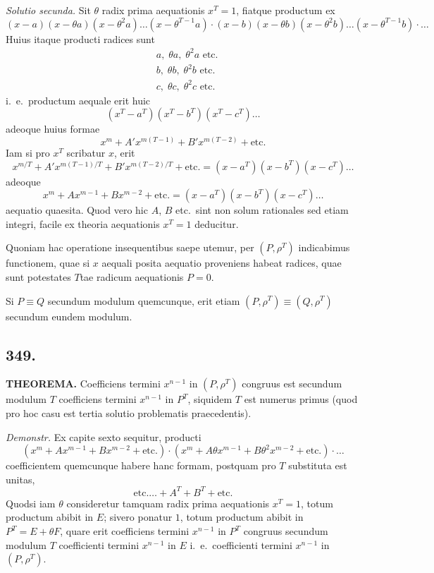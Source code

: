 \documentclass[12pt]{article}
\begin{document}
\textit{Solutio secunda.} Sit $\theta$ radix prima aequationis $x^T=1$, fiatque productum ex
\[
(x-a)(x-\theta a)(x-\theta^2 a)\ldots(x-\theta^{T-1}a) \cdot (x-b)(x-\theta b)(x-\theta^2 b)\ldots(x-\theta^{T-1}b) \cdot \ldots
\]
Huius itaque producti radices sunt
\[
\begin{aligned}
& a,\; \theta a,\; \theta^2 a \text{ etc.}\\
& b,\; \theta b,\; \theta^2 b \text{ etc.}\\
& c,\; \theta c,\; \theta^2 c \text{ etc.}
\end{aligned}
\]
i.~e.~productum aequale erit huic
\[
(x^T-a^T)(x^T-b^T)(x^T-c^T)\ldots
\]
adeoque huius formae
\[
x^m + A'x^{m(T-1)} + B'x^{m(T-2)} + \text{etc.}
\]
Iam si pro $x^T$ scribatur $x$, erit
\[
x^{m/T} + A'x^{m(T-1)/T} + B'x^{m(T-2)/T} + \text{etc.} = (x-a^T)(x-b^T)(x-c^T)\ldots
\]
adeoque
\[
x^m + Ax^{m-1} + Bx^{m-2} + \text{etc.} = (x-a^T)(x-b^T)(x-c^T)\ldots
\]
aequatio quaesita. Quod vero hic $A$, $B$ etc.~sint non solum rationales sed etiam integri, facile ex theoria aequationis $x^T=1$ deducitur.

Quoniam hac operatione insequentibus saepe utemur, per $(P,\rho^T)$ indicabimus functionem, quae si $x$ aequali posita aequatio proveniens habeat radices, quae sunt potestates $T$tae radicum aequationis $P=0$.

Si $P\equiv Q$ secundum modulum quemcunque, erit etiam $(P,\rho^T)\equiv (Q,\rho^T)$ secundum eundem modulum.

\subsection*{349.}

\textbf{THEOREMA.} Coefficiens termini $x^{n-1}$ in $(P,\rho^T)$ congruus est secundum modulum $T$ coefficiens termini $x^{n-1}$ in $P^T$, siquidem $T$ est numerus primus (quod pro hoc casu est tertia solutio problematis praecedentis).

\textit{Demonstr.} Ex capite sexto sequitur, producti
\[
(x^m+Ax^{m-1}+Bx^{m-2}+\text{etc.})\cdot(x^m+A\theta x^{m-1}+B\theta^2 x^{m-2}+\text{etc.})\cdot\ldots
\]
coefficientem quemcunque habere hanc formam, postquam pro $T$ substituta est unitas,
\[
\text{etc.}\ldots + A^T + B^T + \text{etc.}
\]
Quodsi iam $\theta$ consideretur tamquam radix prima aequationis $x^T=1$, totum productum abibit in $E$; sivero ponatur $1$, totum productum abibit in $P^T=E+\theta F$, quare erit coefficiens termini $x^{n-1}$ in $P^T$ congruus secundum modulum $T$ coefficienti termini $x^{n-1}$ in $E$ i.~e.~coefficienti termini $x^{n-1}$ in $(P,\rho^T)$.
\end{document}
